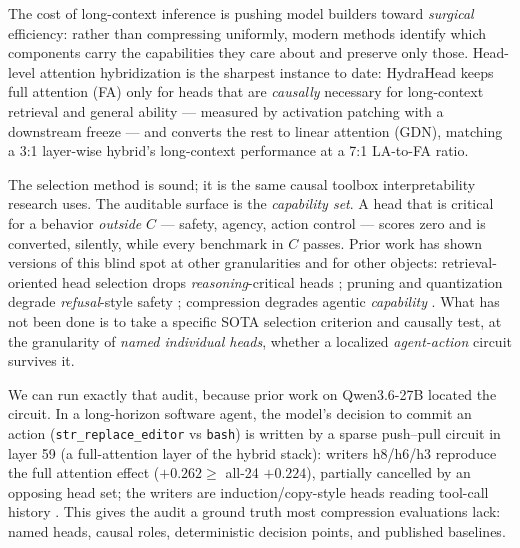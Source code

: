 \documentclass[11pt]{article}
\begin{document}
The cost of long-context inference is pushing model builders toward \emph{surgical} efficiency: rather than
compressing uniformly, modern methods identify which components carry the capabilities they care about and
preserve only those. Head-level attention hybridization is the sharpest instance to date: HydraHead
\citep{tan2026hydrahead} keeps full attention (FA) only for heads that are \emph{causally} necessary for
long-context retrieval and general ability --- measured by activation patching with a downstream freeze ---
and converts the rest to linear attention (GDN), matching a 3:1 layer-wise hybrid's long-context
performance at a 7:1 LA-to-FA ratio.

The selection method is sound; it is the same causal toolbox interpretability research uses. The auditable
surface is the \emph{capability set}. A head that is critical for a behavior \emph{outside} $C$ ---
safety, agency, action control --- scores zero and is converted, silently, while every benchmark in $C$
passes. Prior work has shown versions of this blind spot at other granularities and for other objects:
retrieval-oriented head selection drops \emph{reasoning}-critical heads \citep{du2025rlkv}; pruning and
quantization degrade \emph{refusal}-style safety
\citep{wei2024brittleness,patel2025aapp,chen2025qresafe,jahan2025distillation}; compression degrades
agentic \emph{capability} \citep{dong2025acbench}. What has not been done is to take a specific SOTA
selection criterion and causally test, at the granularity of \emph{named individual heads}, whether a
localized \emph{agent-action} circuit survives it.

We can run exactly that audit, because prior work on Qwen3.6-27B located the circuit. In a long-horizon
software agent, the model's decision to commit an action (\texttt{str\_replace\_editor} vs \texttt{bash})
is written by a sparse push--pull circuit in layer 59 (a full-attention layer of the hybrid stack):
writers h8/h6/h3 reproduce the full attention effect ($+0.262 \geq$ all-24 $+0.224$), partially cancelled
by an opposing head set; the writers are induction/copy-style heads reading tool-call history
\citep{vicentino2026lever,vicentino2026brake}. This gives the audit a ground truth most compression
evaluations lack: named heads, causal roles, deterministic decision points, and published baselines.
\end{document}
